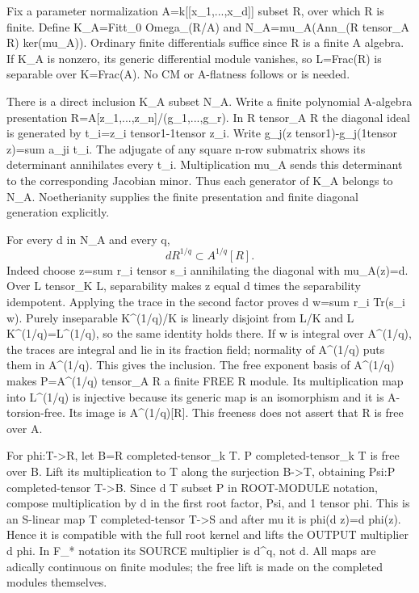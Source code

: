 \documentclass[11pt]{article}
\begin{document}
Fix a parameter normalization A=k[[x\_1,...,x\_d]] subset R, over which R is finite. Define K\_A=Fitt\_0 Omega\_(R/A) and N\_A=mu\_A(Ann\_(R tensor\_A R) ker(mu\_A)). Ordinary finite differentials suffice since R is a finite A algebra. If K\_A is nonzero, its generic differential module vanishes, so L=Frac(R) is separable over K=Frac(A). No CM or A-flatness follows or is needed.

There is a direct inclusion K\_A subset N\_A. Write a finite polynomial A-algebra presentation R=A[z\_1,...,z\_n]/(g\_1,...,g\_r). In R tensor\_A R the diagonal ideal is generated by t\_i=z\_i tensor1-1tensor z\_i. Write g\_j(z tensor1)-g\_j(1tensor z)=sum a\_ji t\_i. The adjugate of any square n-row submatrix shows its determinant annihilates every t\_i. Multiplication mu\_A sends this determinant to the corresponding Jacobian minor. Thus each generator of K\_A belongs to N\_A. Noetherianity supplies the finite presentation and finite diagonal generation explicitly.

For every d in N\_A and every q,
\[
dR^{1/q}\subset A^{1/q}[R].
\]
Indeed choose z=sum r\_i tensor s\_i annihilating the diagonal with mu\_A(z)=d. Over L tensor\_K L, separability makes z equal d times the separability idempotent. Applying the trace in the second factor proves d w=sum r\_i Tr(s\_i w). Purely inseparable K\textasciicircum{}(1/q)/K is linearly disjoint from L/K and L K\textasciicircum{}(1/q)=L\textasciicircum{}(1/q), so the same identity holds there. If w is integral over A\textasciicircum{}(1/q), the traces are integral and lie in its fraction field; normality of A\textasciicircum{}(1/q) puts them in A\textasciicircum{}(1/q). This gives the inclusion. The free exponent basis of A\textasciicircum{}(1/q) makes P=A\textasciicircum{}(1/q) tensor\_A R a finite FREE R module. Its multiplication map into L\textasciicircum{}(1/q) is injective because its generic map is an isomorphism and it is A-torsion-free. Its image is A\textasciicircum{}(1/q)[R]. This freeness does not assert that R is free over A.

For phi:T->R, let B=R completed-tensor\_k T. P completed-tensor\_k T is free over B. Lift its multiplication to T along the surjection B->T, obtaining Psi:P completed-tensor T->B. Since d T subset P in ROOT-MODULE notation, compose multiplication by d in the first root factor, Psi, and 1 tensor phi. This is an S-linear map T completed-tensor T->S and after mu it is phi(d z)=d phi(z). Hence it is compatible with the full root kernel and lifts the OUTPUT multiplier d phi. In F\_* notation its SOURCE multiplier is d\textasciicircum{}q, not d. All maps are adically continuous on finite modules; the free lift is made on the completed modules themselves.
\end{document}
